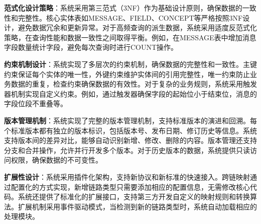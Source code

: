 \textbf{范式化设计策略}：系统采用第三范式（3NF）作为基础设计原则，确保数据的一致性和完整性。核心实体表如MESSAGE、FIELD、CONCEPT等严格按照3NF设计，避免数据冗余和更新异常。对于高频查询的派生数据，系统采用适度反范式化策略，在查询性能和数据一致性之间取得平衡。例如，在MESSAGE表中增加消息字段数量统计字段，避免每次查询时进行COUNT操作。

\textbf{约束机制设计}：系统实现了多层次的约束机制，确保数据的完整性和一致性。主键约束保证每个实体的唯一性，外键约束维护实体间的引用完整性，唯一约束防止业务数据的重复，检查约束确保数据的有效性。对于复杂的业务规则，系统采用触发器机制实现自定义约束。例如，通过触发器确保字段的起始位小于结束位，消息的字段位段不重叠等。

\textbf{版本管理机制}：系统实现了完整的版本管理机制，支持标准版本的演进和回溯。每个标准版本都有独立的版本标识，包括版本号、发布日期、修订历史等信息。系统支持版本间的差异对比，能够自动识别新增、修改、删除的内容。版本管理还支持分支和合并操作，允许并行开发多个版本。对于历史版本的数据，系统提供只读访问权限，确保数据的不可变性。

\textbf{扩展性设计}：系统采用插件化架构，支持新协议和新标准的快速接入。跨链映射通过配置化的方式实现，新增链路类型只需要添加相应的配置信息，无需修改核心代码。系统还提供了标准化的扩展接口，支持第三方开发自定义的映射规则和转换算法。扩展机制采用事件驱动模式，当检测到新的链路类型时，系统自动加载相应的处理模块。

